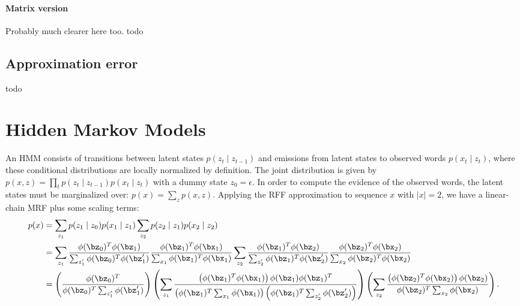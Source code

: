 \documentclass{article}
\begin{document}
\paragraph{Matrix version}
Probably much clearer here too.
todo

\subsection{Approximation error}
todo

\section{Hidden Markov Models}
An HMM consists of transitions between latent states $p(z_t \mid z_{t-1})$
and emissions from latent states to observed words $p(x_t \mid z_t)$,
where these conditional distributions are locally normalized by definition.
The joint distribution is given by $p(x, z) = \prod_t p(z_t \mid z_{t-1})p(x_t \mid z_t)$
with a dummy state $z_0 = \epsilon$.
In order to compute the evidence of the observed words, the latent states must be
marginalized over: $p(x) = \sum_z p(x,z)$.
Applying the RFF approximation to sequence $x$ with $|x| = 2$, we have
a linear-chain MRF plus some scaling terms:
\begin{equation}
\begin{aligned}
p(x)
&= \sum_{z_1} p(z_1 \mid z_0)p(x_1 \mid z_1)  \sum_{z_2} p(z_2 \mid z_1)p(x_2 \mid z_2)\\
&= \sum_{z_1} \frac{\phi(\bz_0)^T\phi(\bz_1)}{\sum_{z_1'}\phi(\bz_0)^T\phi(\bz'_1)}
\frac{\phi(\bz_1)^T\phi(\bx_1)}{\sum_{x_1}\phi(\bz_1)^T\phi(\bx_1)}
\sum_{z_2} \frac{\phi(\bz_1)^T\phi(\bz_2)}{\sum_{z_2'}\phi(\bz_1)^T\phi(\bz_2')}
\frac{\phi(\bz_2)^T\phi(\bx_2)}{\sum_{x_2}\phi(\bz_2)^T\phi(\bx_2)}\\
&= \left(\frac{\phi(\bz_0)^T}{\phi(\bz_0)^T\sum_{z_1'}\phi(\bz'_1)}\right)
\left(
\sum_{z_1} 
\frac{\left(\phi(\bz_1)^T\phi(\bx_1)\right)\phi(\bz_1)\phi(\bz_1)^T}
{
    \left(\phi(\bz_1)^T\sum_{x_1}\phi(\bx_1)\right)
    \left(\phi(\bz_1)^T\sum_{z_2'}\phi(\bz_2')\right)
}
\right)
\left(
\sum_{z_2} 
\frac{\left(\phi(\bz_2)^T\phi(\bx_2)\right)\phi(\bz_2)}{\phi(\bz_2)^T\sum_{x_2}\phi(\bx_2)}
\right).
\end{aligned}
\end{equation}
\end{document}
